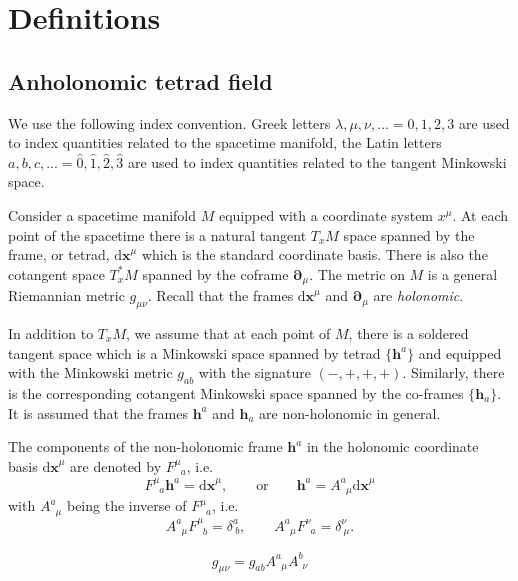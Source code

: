 \documentclass[
10pt, %
a4paper, %
oneside, %
headinclude,footinclude, %
BCOR5mm, %
]{scrartcl}
\newcommand{\pdd}[1]{{\bm{\partial}_{#1}}}
\newcommand{\dx}[1]{{\bm{\mathrm{d}x}^{#1}}}
\newcommand{\bas}[1]{\bm{h}^{#1}}
\newcommand{\cobas}[1]{\bm{h}_{#1}}
\newcommand{\itetr}[2]{F^{#1}_{\phantom{#1}#2}}
\newcommand{\tetr}[2]{A^{#1}_{\phantom{#1}#2}}
\begin{document}
\section{Definitions}

\subsection{Anholonomic tetrad field}

We use the following index convention. Greek letters $ \lambda,\mu,\nu,... =0,1,2,3
$ are used to index quantities related to the spacetime manifold, the Latin letters $ a,b,c,... 
=\hat{0},\hat{1},\hat{2},\hat{3}$ are used to index quantities related to the tangent Minkowski 
space.



Consider a spacetime manifold $ M $ equipped with a coordinate system $ x^\mu $. At each point of 
the spacetime there is a natural tangent $ T_{x}M $ space spanned by the frame, or tetrad, $ 
\dx{\mu} $ which is the standard coordinate basis. 
There is also the cotangent space $ T_x^*M $ spanned by the coframe $ \pdd{\mu} $.
The metric on $ M $ is a general Riemannian metric $ g_{\mu\nu} $. 
Recall that the frames $ \dx{\mu} $ and $ \pdd{\mu} $ are \emph{holonomic}.

In addition to $ T_{x}M $, we assume that at each point of $ M $, there is a soldered tangent space 
which is a Minkowski space spanned by tetrad $ \{ \bas{a} \}$ and equipped with the 
Minkowski metric $ g_{ab} $ with the signature $ 
(-,+,+,+) $. Similarly, there is the 
corresponding cotangent Minkowski space spanned by the co-frames $ \{ \cobas{a} \}$. It is assumed 
that the frames $ \bas{a} $ and $ \cobas{a} $ are non-holonomic in general.

The components of the non-holonomic frame $ \bas{a} $ in the holonomic coordinate basis $ \dx{\mu} 
$ are denoted by $ \itetr{\mu}{a} $, i.e. 
\begin{equation}
	\itetr{\mu}{a} \bas{a} = \dx{\mu}, \qquad \text{or} \qquad \bas{a} = \tetr{a}{\mu}\dx{\mu}
\end{equation}
with $ \tetr{a}{\mu} $ being the inverse of $ \itetr{\mu}{a} $, i.e.
\begin{equation}\label{eqn.inv.tetr}
	\tetr{a}{\mu} \itetr{\mu}{b} = \delta^a_{\ b},
	\qquad
	\tetr{a}{\mu} \itetr{\nu}{a} = \delta^\nu_{\ \mu}.
\end{equation}


\begin{equation}
	g_{\mu\nu} = g_{ab} \tetr{a}{\mu}\tetr{b}{\nu}
\end{equation}
\end{document}
